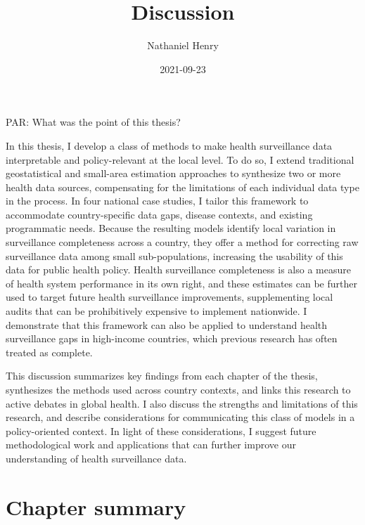 \documentclass[
]{article}
\title{Discussion}
\author{Nathaniel Henry\textsuperscript{}}
\date{2021-09-23}
\begin{document}
\maketitle

PAR: What was the point of this thesis?

In this thesis, I develop a class of methods to make health surveillance data interpretable and policy-relevant at the local level. To do so, I extend traditional geostatistical and small-area estimation approaches to synthesize two or more health data sources, compensating for the limitations of each individual data type in the process. In four national case studies, I tailor this framework to accommodate country-specific data gaps, disease contexts, and existing programmatic needs. Because the resulting models identify local variation in surveillance completeness across a country, they offer a method for correcting raw surveillance data among small sub-populations, increasing the usability of this data for public health policy. Health surveillance completeness is also a measure of health system performance in its own right, and these estimates can be further used to target future health surveillance improvements, supplementing local audits that can be prohibitively expensive to implement nationwide. I demonstrate that this framework can also be applied to understand health surveillance gaps in high-income countries, which previous research has often treated as complete.

This discussion summarizes key findings from each chapter of the thesis, synthesizes the methods used across country contexts, and links this research to active debates in global health. I also discuss the strengths and limitations of this research, and describe considerations for communicating this class of models in a policy-oriented context. In light of these considerations, I suggest future methodological work and applications that can further improve our understanding of health surveillance data.

\hypertarget{chapter-summary}{%
\section{Chapter summary}\label{chapter-summary}}
\end{document}

